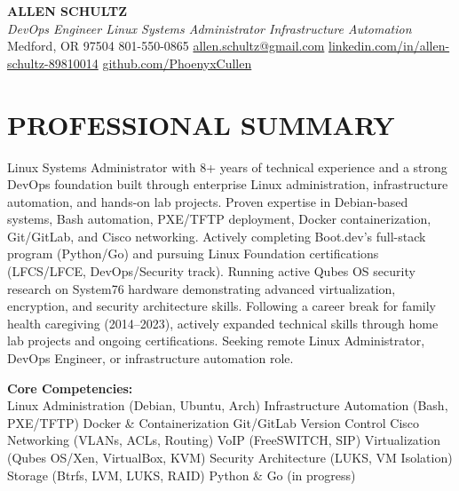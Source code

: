 \documentclass[9pt,letterpaper]{extarticle}
\begin{document}
\begin{center}
  {\LARGE\bfseries\color{accent} ALLEN SCHULTZ}\\[3pt]
  {\normalsize\itshape DevOps Engineer \textbar{} Linux Systems Administrator \textbar{} Infrastructure Automation}\\[4pt]
  {\small
    Medford, OR 97504 \textbar{} 801-550-0865 \textbar{}
    \href{mailto:allen.schultz@gmail.com}{allen.schultz@gmail.com} \textbar{}
    \href{https://linkedin.com/in/allen-schultz-89810014}{linkedin.com/in/allen-schultz-89810014} \textbar{}
    \href{https://github.com/PhoenyxCullen}{github.com/PhoenyxCullen}
  }
\end{center}
\vspace{-10pt}
\section*{PROFESSIONAL SUMMARY}

Linux Systems Administrator with 8+ years of technical experience and a strong DevOps foundation built through enterprise Linux administration, infrastructure automation, and hands-on lab projects. Proven expertise in Debian-based systems, Bash automation, PXE/TFTP deployment, Docker containerization, Git/GitLab, and Cisco networking. Actively completing Boot.dev's full-stack program (Python/Go) and pursuing Linux Foundation certifications (LFCS/LFCE, DevOps/Security track). Running active Qubes OS security research on System76 hardware demonstrating advanced virtualization, encryption, and security architecture skills. Following a career break for family health caregiving (2014--2023), actively expanded technical skills through home lab projects and ongoing certifications. Seeking remote Linux Administrator, DevOps Engineer, or infrastructure automation role.

\smallskip
\textbf{Core Competencies:}\\
Linux Administration (Debian, Ubuntu, Arch) \textbullet{}
Infrastructure Automation (Bash, PXE/TFTP) \textbullet{}
Docker \& Containerization \textbullet{}
Git/GitLab Version Control \textbullet{}
Cisco Networking (VLANs, ACLs, Routing) \textbullet{}
VoIP (FreeSWITCH, SIP) \textbullet{}
Virtualization (Qubes OS/Xen, VirtualBox, KVM) \textbullet{}
Security Architecture (LUKS, VM Isolation) \textbullet{}
Storage (Btrfs, LVM, LUKS, RAID) \textbullet{}
Python \& Go (in progress)
\end{document}
